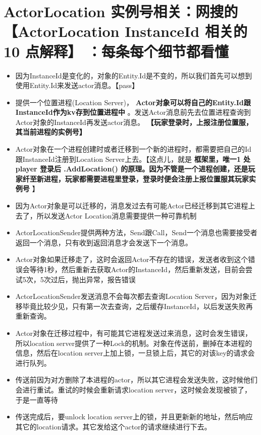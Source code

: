 \documentclass[9pt, b5paper]{article}
\begin{document}
\section{ActorLocation 实例号相关：网搜的 \textbf{【ActorLocation InstanceId 相关的10 点解释】} ：每条每个细节都看懂}
\label{sec-6}
\begin{itemize}
\item 因为InstanceId是变化的，对象的Entity.Id是不变的，所以我们首先可以想到使用Entity.Id来发送actor消息。【pass】
\item 提供一个位置进程(Location Server)， \textbf{Actor对象可以将自己的Entity.Id跟InstanceId作为kv存到位置进程中} 。发送Actor消息前先去位置进程查询到Actor对象的InstanceId再发送actor消息。 \textbf{【玩家登录时，上报注册位置服，其当前进程的实例号】}
\item Actor对象在一个进程创建时或者迁移到一个新的进程时，都需要把自己的Id跟InstanceId注册到Location Server上去。【这点儿，就是 \textbf{框架里，唯一1 处 player 登录后 .AddLocation() 的原理。因为不管是一个进程创建，还是玩家纤至新进程，玩家都需要进程里登录，登录时便会注册上报位置服其玩家实例号} 】
\item 因为Actor对象是可以迁移的，消息发过去有可能Actor已经迁移到其它进程上去了，所以发送Actor Location消息需要提供一种可靠机制
\item ActorLocationSender提供两种方法，Send跟Call，Send一个消息也需要接受者返回一个消息，只有收到返回消息才会发送下一个消息。
\item Actor对象如果迁移走了，这时会返回Actor不存在的错误，发送者收到这个错误会等待1秒，然后重新去获取Actor的InstanceId，然后重新发送，目前会尝试5次，5次过后，抛出异常，报告错误
\item ActorLocationSender发送消息不会每次都去查询Location Server，因为对象迁移毕竟比较少见，只有第一次去查询，之后缓存InstanceId，以后发送失败再重新查询。
\item Actor对象在迁移过程中，有可能其它进程发送过来消息，这时会发生错误，所以location server提供了一种Lock的机制。对象在传送前，删掉在本进程的信息，然后在location server上加上锁，一旦锁上后，其它的对该key的请求会进行队列。
\item 传送前因为对方删除了本进程的actor，所以其它进程会发送失败，这时候他们会进行重试。重试的时候会重新请求location server，这时候会发现被锁了，于是一直等待
\item 传送完成后，要unlock location server上的锁，并且更新新的地址，然后响应其它的location请求。其它发给这个actor的请求继续进行下去。
\end{itemize}
\end{document}

